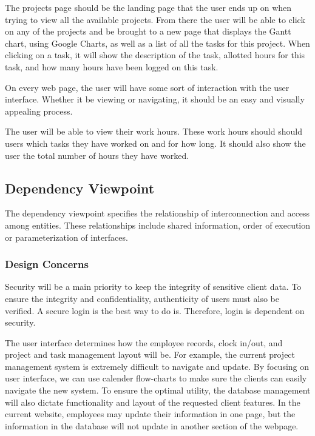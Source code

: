 \documentclass[letterpaper,10pt,titlepage,journal,compsoc,draftclsnofoot,onecolumn]{IEEEtran}
\newcommand\tab[1][1cm]{\hspace*{#1}}
\begin{document}
\tab The projects page should be the landing page that the user ends up on when trying to view all the available projects. From there the user will be able to click on any of the projects and be brought to a new page that displays the Gantt chart, using Google Charts, as well as a list of all the tasks for this project. When clicking on a task, it will show the description of the task, allotted hours for this task, and how many hours have been logged on this task. \newline


\tab On every web page, the user will have some sort of interaction with the user interface. Whether it be viewing or navigating, it should be an easy and visually appealing process. \newline


\tab The user will be able to view their work hours. These work hours should should users which tasks they have worked on and for how long. It should also show the user the total number of hours they have worked. \newline

\subsection{Dependency Viewpoint}

\tab The dependency viewpoint specifies the relationship of interconnection and access among entities. These relationships include shared information, order of execution or parameterization of interfaces.

\subsubsection{Design Concerns}

\tab
Security will be a main priority to keep the integrity of sensitive client data. To ensure the integrity and confidentiality, authenticity of users must also be verified. A secure login is the best way to do is. Therefore, login is dependent on security.\newline


\tab
The user interface determines how the employee records, clock in/out, and project and task management layout will be. For example, the current project management system is extremely difficult to navigate and update. By focusing on user interface, we can use calender flow-charts to make sure the clients can easily navigate the new system. To ensure the optimal utility, the database management will also dictate functionality and layout of the requested client features. In the current website, employees may update their information in one page, but the information in the database will not update in another section of the webpage. 
\end{document}

